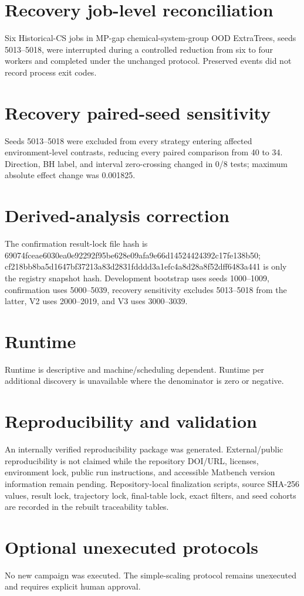 \documentclass[9pt]{article}
\begin{document}
\section{Recovery job-level reconciliation}
Six Historical-CS jobs in MP-gap chemical-system-group OOD ExtraTrees, seeds 5013--5018, were interrupted during a controlled reduction from six to four workers and completed under the unchanged protocol. Preserved events did not record process exit codes.
\section{Recovery paired-seed sensitivity}
Seeds 5013--5018 were excluded from every strategy entering affected environment-level contrasts, reducing every paired comparison from 40 to 34. Direction, BH label, and interval zero-crossing changed in 0/8 tests; maximum absolute effect change was 0.001825.
\section{Derived-analysis correction}
The confirmation result-lock file hash is 69074fceae6030ea0e92292f95be628e09afa9e66d14524424392c17fe138b50; cf218bb8ba5d1647bf37213a83d2831fdddd3a1efc4a8d28a8f52dff6483a441 is only the registry snapshot hash. Development bootstrap uses seeds 1000--1009, confirmation uses 5000--5039, recovery sensitivity excludes 5013--5018 from the latter, V2 uses 2000--2019, and V3 uses 3000--3039.
\section{Runtime}
Runtime is descriptive and machine/scheduling dependent. Runtime per additional discovery is unavailable where the denominator is zero or negative.
\section{Reproducibility and validation}
An internally verified reproducibility package was generated. External/public
reproducibility is not claimed while the repository DOI/URL, licenses,
environment lock, public run instructions, and accessible Matbench version
information remain pending.
Repository-local finalization scripts, source SHA-256 values, result lock, trajectory lock, final-table lock, exact filters, and seed cohorts are recorded in the rebuilt traceability tables.
\section{Optional unexecuted protocols}
No new campaign was executed. The simple-scaling protocol remains unexecuted and requires explicit human approval.
\end{document}

